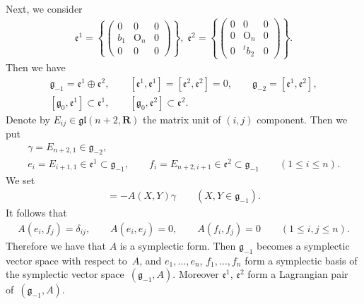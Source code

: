 \documentclass[pdftex]{sigma}
\begin{document}
Next, we consider
\begin{gather*}  \mathfrak{e}^1=\left\{{\begin{pmatrix}
                      0 & 0 & 0 \\
                      b_1 & \mathrm{O}_n & 0 \\
                      0 & 0 & 0
                    \end{pmatrix}}\right\}, \;
  \mathfrak{e}^2=\left\{{\begin{pmatrix}
                      0 & 0 & 0 \\
                      0 & \mathrm{O}_n & 0 \\
                      0 & {}^tb_2 & 0
                     \end{pmatrix}}\right\}.
\end{gather*}
Then we have
\begin{gather*}
\mathfrak{g}_{-1}=\mathfrak{e}^1\oplus \mathfrak{e}^2,\qquad
[\mathfrak{e}^1,\mathfrak{e}^1]=[\mathfrak{e}^2,\mathfrak{e}^2]=0,\qquad
\mathfrak{g}_{-2}=[\mathfrak{e}^1,\mathfrak{e}^2],
\\
[\mathfrak{g}_0,\mathfrak{e}^1]
       \subset \mathfrak{e}^1,\qquad
       [\mathfrak{g}_0,\mathfrak{e}^2]
       \subset \mathfrak{e}^2.
\end{gather*}
Denote by $E_{ij}\in \mathfrak{gl}(n+2,{\mathbf{R}})$ the matrix unit of
$(i,j)$ component. Then we put
\begin{gather*}
\gamma =E_{n+2,1}\in \mathfrak{g}_{-2},\\
e_i =E_{i+1,1}\in
\mathfrak{e}^1\subset \mathfrak{g}_{-1},\qquad f_i=E_{n+2,i+1}\in
\mathfrak{e}^2\subset \mathfrak{g}_{-1}\qquad (1\leq i\leq n).
\end{gather*}
We set
\begin{gather*}
[X,Y] = - A(X,Y)\gamma \qquad (X,Y\in \mathfrak{g}_{-1}).
\end{gather*}
It follows that
\begin{gather*}
A(e_i,f_j)={\delta}_{ij}, \qquad A(e_i, e_j) = 0, \qquad A(f_i, f_j) = 0 \qquad  (1 \leq i, j \leq n).
\end{gather*}
Therefore we have that $A$ is a symplectic form.
Then $\mathfrak{g}_{-1}$ becomes a symplectic vector space with respect to~$A$,  and
$e_1, \dots, e_n$, $f_1, \dots, f_n$ form a symplectic basis of the symplectic vector space~$(\mathfrak{g}_{-1},A)$.
Moreover
$\mathfrak{e}^1$, $\mathfrak{e}^2$ form a Lagrangian pair of~$(\mathfrak{g}_{-1}, A)$.
\end{document}
